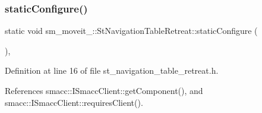 \subsubsection{\texorpdfstring{static\+Configure()}{staticConfigure()}}
{\footnotesize\ttfamily static void sm\+\_\+moveit\+\_\+::\+St\+Navigation\+Table\+Retreat\+::static\+Configure (\begin{DoxyParamCaption}{ }\end{DoxyParamCaption})\hspace{0.3cm}{\ttfamily [inline]}, {\ttfamily [static]}}



Definition at line 16 of file st\+\_\+navigation\+\_\+table\+\_\+retreat.\+h.



References smacc\+::\+I\+Smacc\+Client\+::get\+Component(), and smacc\+::\+I\+Smacc\+Client\+::requires\+Client().



